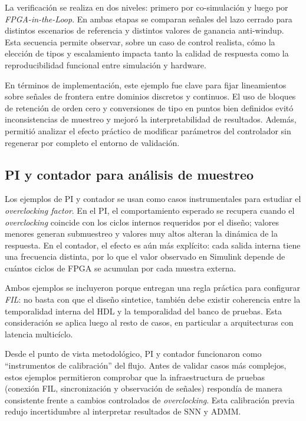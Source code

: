 La verificación se realiza en dos niveles: primero por co-simulación y luego por \textit{FPGA-in-the-Loop}. En ambas etapas se comparan señales del lazo cerrado para distintos escenarios de referencia y distintos valores de ganancia anti-windup. Esta secuencia permite observar, sobre un caso de control realista, cómo la elección de tipos y escalamiento impacta tanto la calidad de respuesta como la reproducibilidad funcional entre simulación y hardware.

En términos de implementación, este ejemplo fue clave para fijar lineamientos sobre señales de frontera entre dominios discretos y continuos. El uso de bloques de retención de orden cero y conversiones de tipo en puntos bien definidos evitó inconsistencias de muestreo y mejoró la interpretabilidad de resultados. Además, permitió analizar el efecto práctico de modificar parámetros del controlador sin regenerar por completo el entorno de validación.

\subsection{PI y contador para análisis de muestreo}

Los ejemplos de PI y contador se usan como casos instrumentales para estudiar el \textit{overclocking factor}. En el PI, el comportamiento esperado se recupera cuando el \textit{overclocking} coincide con los ciclos internos requeridos por el diseño; valores menores generan submuestreo y valores muy altos alteran la dinámica de la respuesta. En el contador, el efecto es aún más explícito: cada salida interna tiene una frecuencia distinta, por lo que el valor observado en Simulink depende de cuántos ciclos de FPGA se acumulan por cada muestra externa.

Ambos ejemplos se incluyeron porque entregan una regla práctica para configurar \textit{FIL}: no basta con que el diseño sintetice, también debe existir coherencia entre la temporalidad interna del HDL y la temporalidad del banco de pruebas. Esta consideración se aplica luego al resto de casos, en particular a arquitecturas con latencia multicíclo.

Desde el punto de vista metodológico, PI y contador funcionaron como ``instrumentos de calibración'' del flujo. Antes de validar casos más complejos, estos ejemplos permitieron comprobar que la infraestructura de pruebas (conexión FIL, sincronización y observación de señales) respondía de manera consistente frente a cambios controlados de \textit{overclocking}. Esta calibración previa redujo incertidumbre al interpretar resultados de SNN y ADMM.

